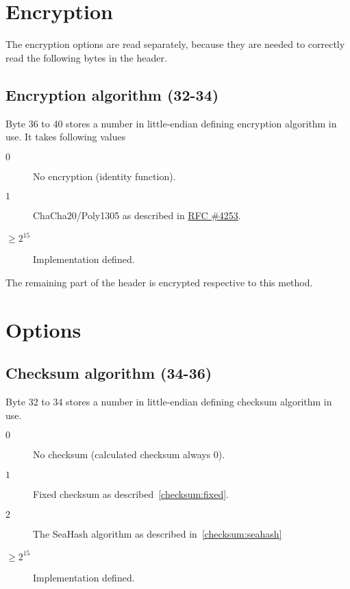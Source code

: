 \documentclass[11pt,a4paper]{report}
\begin{document}
    \section{Encryption}
        The encryption options are read separately, because they are needed to
        correctly read the following bytes in the header.
        \subsection{Encryption algorithm (32-34)}
        \label{config:encryption}
        Byte 36 to 40 stores a number in little-endian defining encryption
        algorithm in use. It takes following values

        \begin{description}
            \item [$0$] No encryption (identity function).
            \item [$1$] ChaCha20/Poly1305 as described in
                \href{https://tools.ietf.org/html/rfc4253}{RFC \#4253}.
            \item [$\geq 2^{15}$] Implementation defined.
        \end{description}

        The remaining part of the header is encrypted respective to this
        method.

    \section{Options}
        \subsection{Checksum algorithm (34-36)}
        \label{config:checksum}
        Byte 32 to 34 stores a number in little-endian defining checksum
        algorithm in use.

        \begin{description}
            \item [$0$] No checksum (calculated checksum always 0).
            \item [$1$] Fixed checksum as described~\ref{checksum:fixed}.
            \item [$2$] The SeaHash algorithm
                as described
                in~\ref{checksum:seahash}
            \item [$\geq 2^{15}$] Implementation defined.
        \end{description}
\end{document}
